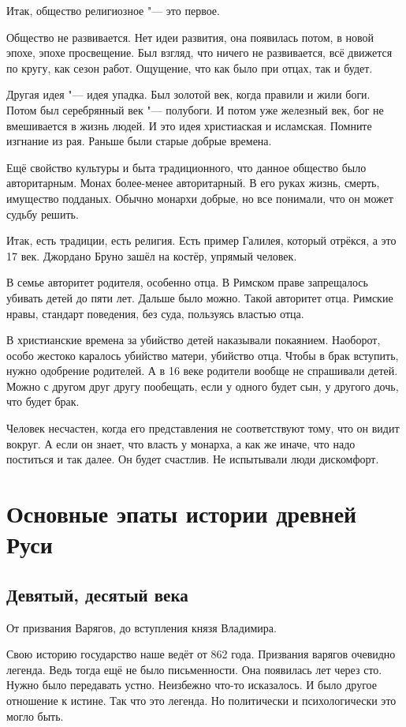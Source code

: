 Итак, общество религиозное "--- это первое.

Общество не развивается. Нет идеи развития, она появилась потом, в новой эпохе, эпохе просвещение. Был взгляд, что ничего не развивается, всё движется по кругу, как сезон работ. Ощущение, что как было при отцах, так и будет.

Другая идея "--- идея упадка. Был золотой век, когда правили и жили боги. Потом был серебрянный век "--- полубоги. И потом уже железный век, бог не вмешивается в жизнь людей. И это идея христиаская и исламская. Помните изгнание из рая. Раньше были старые добрые времена.

Ещё свойство культуры и быта традиционного, что данное общество было авторитарным. Монах более-менее авторитарный. В его руках жизнь, смерть, имущество подданых. Обычно монархи добрые, но все понимали, что он может судьбу решить.

Итак, есть традиции, есть религия. Есть пример Галилея, который отрёкся, а это 17 век. Джордано Бруно зашёл на костёр, упрямый человек.

В семье авторитет родителя, особенно отца. В Римском праве запрещалось убивать детей до пяти лет. Дальше было можно. Такой авторитет отца. Римские нравы, стандарт поведения, без суда, пользуясь властью отца.

В христианские времена за убийство детей наказывали покаянием. Наоборот, особо жестоко каралось убийство матери, убийство отца. Чтобы в брак вступить, нужно одобрение родителей. А в 16 веке родители вообще не спрашивали детей. Можно с другом друг другу пообещать, если у одного будет сын, у другого дочь, что будет брак.

Человек несчастен, когда его представления не соответствуют тому, что он видит вокруг. А если он знает, что власть у монарха, а как же иначе, что надо поститься и так далее. Он будет счастлив. Не испытывали люди дискомфорт.

\section{Основные эпаты истории древней Руси}
\subsection{Девятый, десятый века}
От призвания Варягов, до вступления князя Владимира. 

Свою историю государство наше ведёт от 862 года. Призвания варягов очевидно легенда. Ведь тогда ещё не было письменности. Она появилась лет через сто. Нужно было передавать устно. Неизбежно что-то исказалось. И было другое отношение к истине. Так что это легенда. Но политически и психологически это могло быть.

